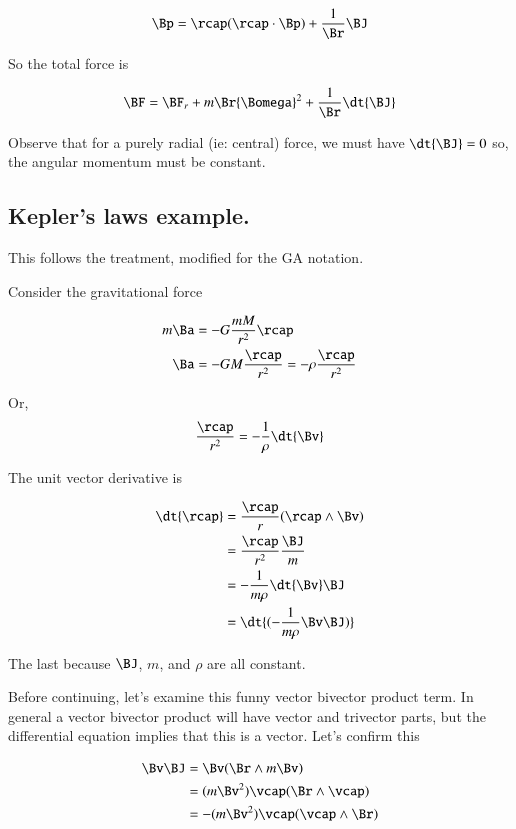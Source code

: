 \[
\Bp = \rcap (\rcap \cdot \Bp) + \frac{1}{\Br} \BJ 
\]

So the total force is

\begin{align*}
\BF 
    &= \BF_r + m \Br {\Bomega}^2 + \frac{1}{\Br}\dt{\BJ} \\
\end{align*}

Observe that for a purely radial (ie: central) force, we must have
$\dt{\BJ} = 0$
so, the angular
momentum must be constant.

\subsection{Kepler's laws example.}

This follows the \cite{salas1990coa} treatment, modified for the GA notation.

Consider the gravitational force 

\begin{align*}
m \Ba &= -G \frac{m M}{r^2} \rcap \\
\Ba &= - G M \frac{\rcap}{r^2} = -\rho \frac{\rcap}{r^2}
\end{align*}

Or,
\[
\frac{\rcap}{r^2} = -\frac{1}{\rho} \dt{\Bv}
\]

The unit vector derivative is

\begin{align*}
\dt{\rcap} &= \frac{\rcap}{r}(\rcap \wedge \Bv) \\
           &= \frac{\rcap}{r^2}\frac{\BJ}{m} \\
           &= -\frac{1}{m \rho} \dt{\Bv} \BJ \\
           &= \dt{(-\frac{1}{m \rho} \Bv \BJ )} \\
\end{align*}

The last because $\BJ$, $m$, and $\rho$ are all constant.

Before continuing, let's examine this funny vector bivector product term.
In general a vector
bivector product will have vector and trivector parts, but
the differential equation implies that this is a vector.  Let's confirm this

\begin{align*}
\Bv \BJ &= \Bv (\Br \wedge m \Bv) \\
        &= (m \Bv^2) \vcap (\Br \wedge \vcap) \\
        &= - (m \Bv^2) \vcap (\vcap \wedge \Br) \\
\end{align*}

